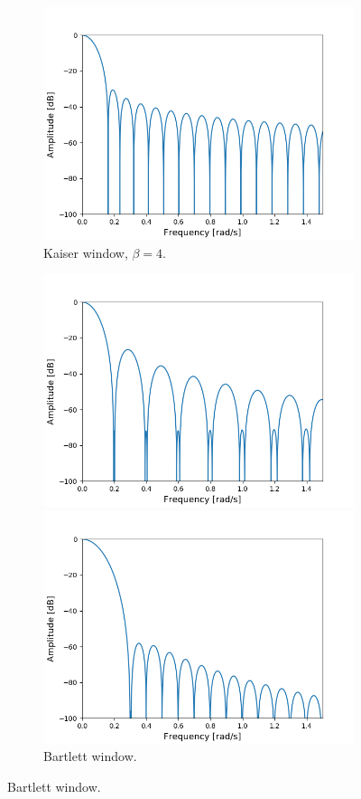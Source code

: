 \begin{figure}[H]
\begin{subfigure}{0.49\textwidth}
\includegraphics[width=\textwidth]{figures/dbplots/stft_bilag/64/kaiser4.png}
\caption{Kaiser window, $\beta=4$.}
\end{subfigure}
\centering
\begin{subfigure}{0.49\textwidth}
\centering
\includegraphics[width=\textwidth]{figures/dbplots/stft_bilag/64/bartlett.png}
\caption{Bartlett window.}
\includegraphics[width=\textwidth]{figures/dbplots/stft_bilag/64/blackman.png}

\end{subfigure}
\end{figure}

